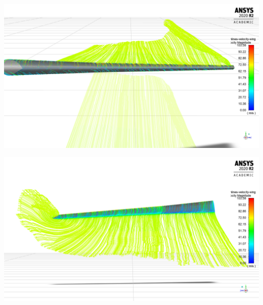 \documentclass{article}
\begin{document}
\begin{center}
  \includegraphics[scale=0.20]{./img/velocitypathlines_front.png}
\end{center}

\begin{center}
  \includegraphics[scale=0.20]{./img/velocitypathlines_back.png}
\end{center}

\printbibliography[title={References}]
\end{document}
